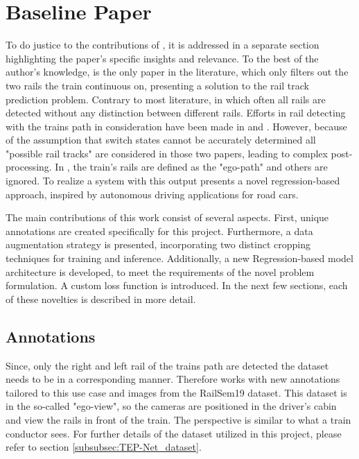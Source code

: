 \section{Baseline Paper}
\label{sec:baselinepaper}

To do justice to the contributions of \cite{tepNet2024}, it is addressed in a separate section highlighting the paper's specific insights and relevance. 
To the best of the author's knowledge, \cite{tepNet2024} is the only paper in the literature, which only filters out the two rails the train continuous on, presenting a solution to the rail track prediction problem.
Contrary to most literature, in which often all rails are detected without any distinction between different rails.
Efforts in rail detecting with the trains path in consideration have been made in \cite{RailraodSemanticPossibleTracks2020} and \cite{TPENet2023}.
However, because of the assumption that switch states cannot be accurately determined all "possible rail tracks" are considered in those two papers, leading to complex post-processing.
In \cite{tepNet2024}, the train's rails are defined as the "ego-path" and others are ignored.
To realize a system with this output \cite{tepNet2024} presents a novel regression-based approach, inspired by autonomous driving applications for road cars.

\vspace{0.5cm}

\noindent The main contributions of this work consist of several aspects.
First, unique annotations are created specifically for this project.
Furthermore, a data augmentation strategy is presented, incorporating two distinct cropping techniques for training and inference.
Additionally, a new Regression-based model architecture is developed, to meet the requirements of the novel problem formulation.
A custom loss function is introduced.
In the next few sections, each of these novelties is described in more detail.

\subsection{Annotations}

Since, only the right and left rail of the trains path are detected the dataset needs to be in a corresponding manner.
Therefore \cite{tepNet2024} works with new annotations tailored to this use case and images from the RailSem19 dataset.
This dataset is in the so-called "ego-view", so the cameras are positioned in the driver's cabin and view the rails in front of the train.
The perspective is similar to what a train conductor sees.
For further details of the dataset utilized in this project, please refer to section \ref{subsubsec:TEP-Net_dataset}.

